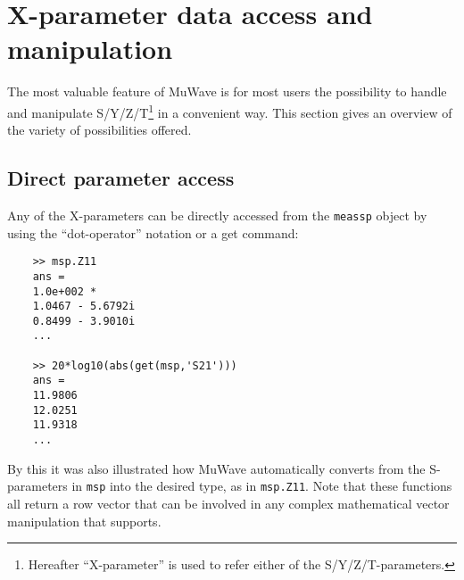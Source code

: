 %
%
%
\section{X-parameter data access and manipulation}\label{sec:SPMod}
The most valuable feature of MuWave is for most users the
possibility to handle and manipulate S/Y/Z/T\footnote{Hereafter
``X-parameter'' is used to refer either of the
S/Y/Z/T-parameters.} in a convenient way. This section gives an
overview of the variety of possibilities offered.

\subsection{Direct parameter access}
Any of the X-parameters can be directly accessed from the
\verb"meassp" object by using the ``dot-operator'' notation or a
get command:

\begin{small}
\begin{verbatim}
    >> msp.Z11
    ans =
    1.0e+002 *
    1.0467 - 5.6792i
    0.8499 - 3.9010i
    ...

    >> 20*log10(abs(get(msp,'S21')))
    ans =
    11.9806
    12.0251
    11.9318
    ...
\end{verbatim}
\end{small}

By this it was also illustrated how MuWave automatically converts
from the S-para\-meters in \verb"msp" into the desired type, as in
\verb"msp.Z11". Note that these functions all return a row vector
that can be involved in any complex mathematical vector
manipulation that \matlab supports.


